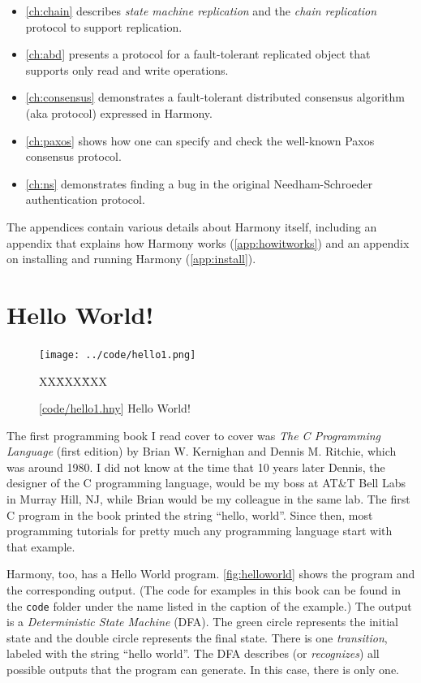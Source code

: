 \documentclass{report}
\newcommand{\harmonysource}[1]{
\begin{tabbing}
XX\=XXX\=XXX\kill
    
\end{tabbing}
}
\newcommand{\harmonylink}[1]{%
[\href{https://harmony.cs.cornell.edu/#1}{\underline{#1}}]%
}
\newenvironment{code}{
\tcolorbox
}{
\endtcolorbox
}
\begin{document}
\begin{itemize}
\item \autoref{ch:chain} describes \emph{state machine replication} and
the \emph{chain replication} protocol to support replication.
\item \autoref{ch:abd} presents a protocol for a fault-tolerant
replicated object that supports only read and write operations.
\item \autoref{ch:consensus} demonstrates a fault-tolerant distributed consensus
algorithm (aka protocol) expressed in Harmony.
\item \autoref{ch:paxos} shows how one can specify and check the well-known
Paxos consensus protocol.
\item \autoref{ch:ns} demonstrates finding a bug in the original Needham-Schroeder
authentication protocol.
\end{itemize}

The appendices contain various details about Harmony itself, including
an appendix that explains how Harmony works (\autoref{app:howitworks}) and
an appendix on installing and running Harmony (\autoref{app:install}).

\chapter{Hello World!}
\label{ch:harmonyintro}

\begin{figure}
\begin{center}
\texttt{[image: ../code/hello1.png]}
\end{center}
\begin{code}
\harmonysource{hello1}
\end{code}
\caption{\harmonylink{code/hello1.hny} Hello World!}
\label{fig:helloworld}
\end{figure}

The first programming book I read cover to cover was \emph{The C Programming
Language} (first edition) by Brian W. Kernighan and Dennis M. Ritchie, which
was around 1980.  I did not know at the time that 10 years later Dennis,
the designer of the C programming language, would be my boss at AT\&T Bell Labs
in Murray Hill, NJ, while Brian would be my colleague in the same lab.
The first C program in the book printed
the string ``hello, world''.  Since then, most programming tutorials for
pretty much any programming language start with that example.

Harmony, too, has a Hello World program.
\autoref{fig:helloworld} shows the program and the corresponding output.
(The code for examples in this book can be found in the \texttt{code} folder under
the name listed in the caption of the example.)
The output is a \emph{Deterministic State Machine} (DFA).  The green circle
represents the initial state and the double circle represents the final
state.  There is one \emph{transition}, labeled with the string
``hello world''.  The DFA describes (or \emph{recognizes}) all possible
outputs that the program can generate.  In this case, there is only one.
\end{document}
